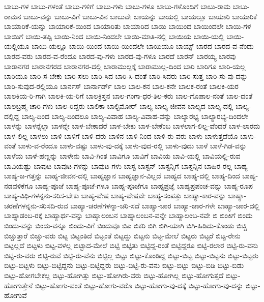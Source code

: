 {ಬಾಬು-ಗಳ
ಬಾಬು-ಗಳಂತೆ
ಬಾಬು-ಗಳಿಗೆ
ಬಾಬು-ಗಳು
ಬಾಬು-ಗಳೂ
ಬಾಬು-ಗಳೊಂದಿಗೆ
ಬಾಬು-ರಾಮ
ಬಾಬು-ರಾಮನ
ಬಾಬು-ವನ್ನು
ಬಾಬು-ವಿಗೆ
ಬಾಬು-ವಿನ
ಬಾಬುವೇ
ಬಾಯನ್ನು
ಬಾಯಲ್ಲಿ
ಬಾಯಲ್ಲೂ
ಬಾಯಾರಿ
ಬಾಯಾರಿಕೆ
ಬಾಯಾರಿಕೆ-ಯನ್ನು
ಬಾಯಾರಿಕೆ-ಯಿಂದ
ಬಾಯಾರಿತು
ಬಾಯಾರಿದ
ಬಾಯಿ
ಬಾಯಿಂದ
ಬಾಯಿಂದಲೇ
ಬಾಯಿ-ಗಳ
ಬಾಯಿಗೆ
ಬಾಯಿ-ತಪ್ಪಿ
ಬಾಯಿ-ನಿಂದ
ಬಾಯಿ-ನಿಂದಲೇ
ಬಾಯಿ-ಮಾತಿ-ನಲ್ಲಿ
ಬಾಯಿಯ
ಬಾಯಿ-ಯಲ್ಲಿ
ಬಾಯಿ-ಯಲ್ಲಿಯೂ
ಬಾಯಿ-ಯಲ್ಲೂ
ಬಾಯಿ-ಯಿಂದ
ಬಾಯಿ-ಯಿಂದಲೇ
ಬಾಯಿಯೂ
ಬಾಯ್ಸ್
ಬಾರದ
ಬಾರದ-ವ-ನೆಂದು
ಬಾರದ-ವರು
ಬಾರದ-ವ-ರೆಂದೂ
ಬಾರದ-ವು-ಗಳು
ಬಾರದ-ವು-ಗಳೂ
ಬಾರದೆ
ಬಾರನ್
ಬಾರಯ್ಯ
ಬಾರವು
ಬಾರಾನಗರ
ಬಾರಾನಗರದ
ಬಾರಾನಗರ-ದಲ್ಲಿ
ಬಾರಾಮುಲ್ಲಕ್ಕೆ
ಬಾರಾಮುಲ್ಲ-ದಿಂದ
ಬಾರಿ
ಬಾರಿಗೂ
ಬಾರಿ-ಯಲ್ಲ
ಬಾರಿಯೂ
ಬಾರಿ-ಸ-ಬೇಕು
ಬಾರಿ-ಸಲು
ಬಾರಿ-ಸಿದ
ಬಾರಿ-ಸಿ-ದಂತೆ
ಬಾರಿ-ಸಿದರು
ಬಾರಿ-ಸುತ್ತ
ಬಾರಿ-ಸು-ವು-ದನ್ನು
ಬಾರಿ-ಸುವುದ-ರಲ್ಲಿಯೂ
ಬಾರ್ನಸ್
ಬಾರ್ನಾರ್ಡ್
ಬಾಲ
ಬಾಲ-ಕನ
ಬಾಲ-ಕನೇ
ಬಾಲಕ-ರಂತೆ
ಬಾಲಕಿ-ಯರ
ಬಾಲಕಿಯ-ರಿ-ಗಾಗಿ
ಬಾಲಕಿ-ಯ-ರಿಗೆ
ಬಾಲಕ್ರಿಸ್ತನ
ಬಾಲ-ಗಂಗಾ-ಧರ-ತಿಲ-ಕರು
ಬಾಲ-ಗೊಪಾಲ-ನಂತೆ
ಬಾಲ-ದಂತೆ
ಬಾಲಬ್ರಹ್ಮ-ಚಾರಿ-ಗಳು
ಬಾಲ-ರಿದ್ದರು
ಬಾಲಿಕಾ
ಬಾಲ್ಟಿಮೋರ್
ಬಾಲ್ಯ
ಬಾಲ್ಯ-ಜೀವನ
ಬಾಲ್ಯದ
ಬಾಲ್ಯ-ದಲ್ಲಿ
ಬಾಲ್ಯ-ದಲ್ಲಿದ್ದ
ಬಾಲ್ಯ-ದಿಂದ
ಬಾಲ್ಯ-ದಿಂದಲೂ
ಬಾಲ್ಯ-ವಿವಾಹ
ಬಾಲ್ಯ-ವಿವಾಹ-ವನ್ನು
ಬಾಲ್ಯಾರಭ್ಯ
ಬಾಲ್ಯಾರಭ್ಯ-ದಿಂದಲೇ
ಬಾಳನ್ನು
ಬಾಳನ್ನೆಲ್ಲಾ
ಬಾಳನ್ನೇ
ಬಾಳ-ಬೇಕಾದರೆ
ಬಾಳ-ಬೇಕು
ಬಾಳ-ಬೇಕೆಂಬ
ಬಾಳಲಾಗ-ಲಿಲ್ಲ-ವೆಂದರೆ
ಬಾಳ-ಲಾರದು
ಬಾಳ-ಲಿಲ್ಲ
ಬಾಳಲು
ಬಾಳಿ
ಬಾಳಿಗೆ
ಬಾಳಿ-ದರು
ಬಾಳಿನ
ಬಾಳಿ-ನಿಂದ
ಬಾಳಿ-ರು-ವರು
ಬಾಳು
ಬಾಳುತ್ತದೆಯೊ
ಬಾಳು-ವಂತೆ
ಬಾಳು-ವ-ರೆಂದೂ
ಬಾಳು-ವಷ್ಟು
ಬಾಳು-ವು-ದಕ್ಕೆ
ಬಾಳು-ವುದ-ರಲ್ಲಿ
ಬಾಳು-ವುದು
ಬಾಳೆ
ಬಾಳೆ-ಗಿಡ-ವನ್ನು
ಬಾಳೆಯ
ಬಾಳೆ-ಹಣ್ಣನ್ನು
ಬಾಳೇನು
ಬಾವಿ-ಗಿಂತ
ಬಾವಿಗೂ
ಬಾವಿಗೆ
ಬಾವಿಯ
ಬಾವಿ-ಯಲ್ಲಿ
ಬಾವಿಯಲ್ಲಿ-ರುವ
ಬಾವಿಯಷ್ಟು
ಬಾವುಟ
ಬಾವುಟ-ಗಳನ್ನು
ಬಾವುಟ-ಗಳು
ಬಾಸ್ಟ
ಬಾಸ್ಟನ್
ಬಾಸ್ಟನ್ನಿಗೆ
ಬಾಸ್ಟನ್ನಿನ
ಬಾಹಿರ-ರಲ್ಲ
ಬಾಹ್ಯ
ಬಾಹ್ಯ-ಜ-ಗತ್ತನ್ನು
ಬಾಹ್ಯ-ಜೀವನ-ದಲ್ಲಿ
ಬಾಹ್ಯಜ್ಞಾನ
ಬಾಹ್ಯಜ್ಞಾನ-ವಿಲ್ಲದೆ
ಬಾಹ್ಯದ
ಬಾಹ್ಯ-ದಲ್ಲಿ
ಬಾಹ್ಯ-ದಿಂದ
ಬಾಹ್ಯ-ನಡವಳಿಕೆಗೂ
ಬಾಹ್ಯ-ಪೂಜೆ
ಬಾಹ್ಯ-ಪೂಜೆ-ಗಳೂ
ಬಾಹ್ಯ-ಪೂಜೆಗೂ
ಬಾಹ್ಯಪ್ರಜ್ಞೆ
ಬಾಹ್ಯಪ್ರಪಂಚ-ವನ್ನು
ಬಾಹ್ಯ-ರೂಪ
ಬಾಹ್ಯ-ವಿಧಿ-ಗಳನ್ನನು-ಸರಿಸ-ಬೇಕು
ಬಾಹ್ಯ-ವೇಷ
ಬಾಹ್ಯ-ವೇಷವೇ
ಬಾಹ್ಯ-ಸಂಪತ್ತು
ಬಾಹ್ಯಾ-ಕಾರ-ವನ್ನು
ಬಾಹ್ಯಾ-ಚರಣೆಗಳನ್ನನು-ಸರಿಸದಿ-ರುವ
ಬಾಹ್ಯಾ-ಚರಣೆಗಳನ್ನಾ-ಚರಿ-ಸದೆ
ಬಾಹ್ಯಾ-ಚಾರ
ಬಾಹ್ಯಾ-ಚಾರ-ಗಳೇ
ಬಾಹ್ಯಾ-ಚಾರ-ದಲ್ಲಿ
ಬಾಹ್ಯಾಡಂಬ-ರಕ್ಕೆ
ಬಾಹ್ಯಾರ್ಥ-ವನ್ನು
ಬಾಹ್ಯಾಲಂಬನ
ಬಾಹ್ಯಾಲಂಬನ-ವನ್ನೇ
ಬಾಹ್ಯಾಲಂಬ-ನವೇ
ಬಿ
ಬಿಂಕಿಗೆ
ಬಿಂದು
ಬಿಂದು-ವನ್ನು
ಬಿಂದು-ವನ್ನೂ
ಬಿಂದು-ವಿಗೆ
ಬಿಂದುವೂ
ಬಿಎ
ಬಿಕರಿ
ಬಿಗಿ
ಬಿಗಿ-ಯಾಗಿ
ಬಿಗಿ-ಹಿಡಿದು-ಕೊಂಡು
ಬಿಚ್ಚಿ
ಬಿಚ್ಚುತ್ತಾರೆ
ಬಿಚ್ಚು-ವರು
ಬಿಟ್ಟ
ಬಿಟ್ಟಂತಿದೆ
ಬಿಟ್ಟಂತೆ
ಬಿಟ್ಟದ್ದು
ಬಿಟ್ಟನು
ಬಿಟ್ಟ-ಮೇಲೆ
ಬಿಟ್ಟರು
ಬಿಟ್ಟರೆ
ಬಿಟ್ಟ-ರೇನು
ಬಿಟ್ಟಲ್ಲದೆ
ಬಿಟ್ಟಳು
ಬಿಟ್ಟ-ವಳಲ್ಲ
ಬಿಟ್ಟಾದ-ಮೇಲೆ
ಬಿಟ್ಟಿ
ಬಿಟ್ಟಿತು
ಬಿಟ್ಟಿದ್ದ-ರಂತೆ
ಬಿಟ್ಟಿದ್ದರೂ
ಬಿಟ್ಟಿ-ರಲಾರ
ಬಿಟ್ಟಿ-ರು-ವನು
ಬಿಟ್ಟಿ-ರು-ವರು
ಬಿಟ್ಟಿ-ರುವೆ
ಬಿಟ್ಟಿ-ರು-ವೆನು
ಬಿಟ್ಟಿಲ್ಲ
ಬಿಟ್ಟು
ಬಿಟ್ಟು-ಕೊಂಡಿದ್ದ
ಬಿಟ್ಟು-ಬಿಟ್ಟ
ಬಿಟ್ಟು-ಬಿಟ್ಟನು
ಬಿಟ್ಟು-ಬಿಟ್ಟರು
ಬಿಟ್ಟು-ಬಿಟ್ಟಳು
ಬಿಟ್ಟು-ಬಿಟ್ಟಿದ್ದನು
ಬಿಟ್ಟು-ಬಿಟ್ಟಿದ್ದರು
ಬಿಟ್ಟು-ಬಿಟ್ಟಿ-ರು-ವನು
ಬಿಟ್ಟು-ಬಿಟ್ಟು
ಬಿಟ್ಟು-ಬಿಡಿ
ಬಿಟ್ಟು-ಬಿಡು
ಬಿಟ್ಟು-ಹೋಗಬೇಕಲ್ಲ
ಬಿಟ್ಟು-ಹೋಗಿತ್ತು
ಬಿಟ್ಟು-ಹೋಗಿರು-ವರು
ಬಿಟ್ಟು-ಹೋಗಿಲ್ಲ
ಬಿಟ್ಟು-ಹೋಗುತ್ತದೆ
ಬಿಟ್ಟು-ಹೋಗುತ್ತೇನೆ
ಬಿಟ್ಟು-ಹೋಗು-ವಂತೆ
ಬಿಟ್ಟು-ಹೋಗು-ವರೊ
ಬಿಟ್ಟು-ಹೋಗು-ವು-ದಕ್ಕೆ
ಬಿಟ್ಟು-ಹೋಗು-ವು-ದನ್ನು
ಬಿಟ್ಟು-ಹೋಗುವೆ
}
